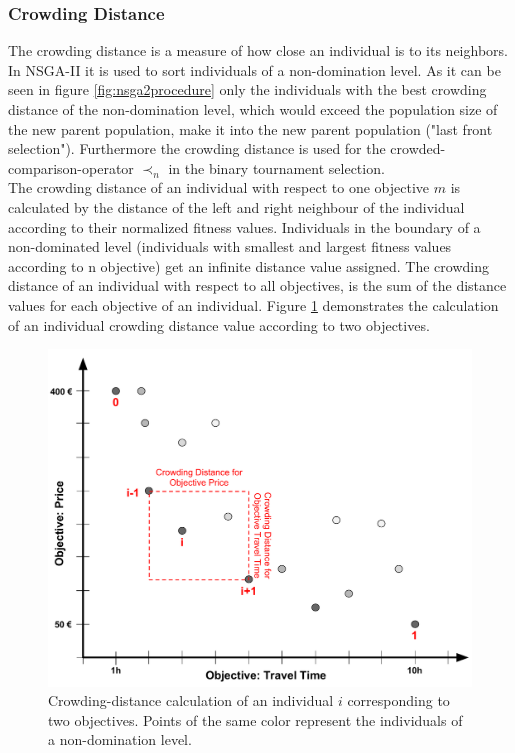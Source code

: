     \subsubsection{Crowding Distance}
    \label{sec:crowdingDistance}
    The crowding distance is a measure of how close an individual is to its neighbors. In NSGA-II it is used to sort individuals of a non-domination level. As it can be seen in figure \ref{fig:nsga2procedure} only the individuals with the best crowding distance of the non-domination level, which would exceed the population size of the new parent population, make it into the new parent population ("last front selection"\cite{Fortin:2013}). Furthermore the crowding distance is used for the crowded-comparison-operator $\prec_n$ in the binary tournament selection.\\
    The crowding distance of an individual with respect to one objective $m$ is calculated by the distance of the left and right neighbour of the individual according to their normalized fitness values. Individuals in the boundary of a non-dominated level (individuals with smallest and largest fitness values according to n objective) get an infinite distance value assigned. The crowding distance of an individual with respect to all objectives, is the sum of the distance values for each objective of an individual. Figure \ref{fig:crowdingDistance} demonstrates the calculation of an individual crowding distance value according to two objectives.\\
    \begin{figure}
        \centering
        \includegraphics[scale=0.3]{./Figures/CrowdingDistance}
        \caption{Crowding-distance calculation of an individual $i$ corresponding to two objectives. Points of the same color represent the individuals of a non-domination level.}
        \label{fig:crowdingDistance}
    \end{figure}
